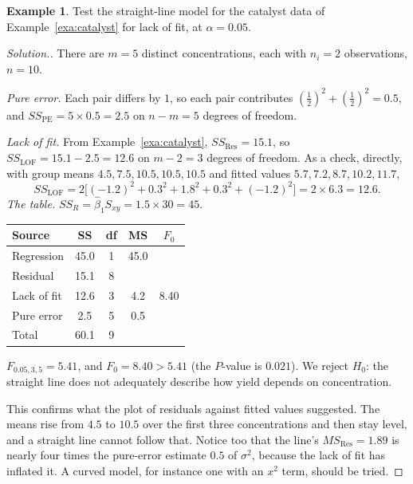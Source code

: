 \documentclass[11pt,a4paper]{article}
\numberwithin{equation}{section}
\theoremstyle{definition}
\newtheorem{exa}[thm]{Example}
\newenvironment{solution}
  {\renewcommand{\qedsymbol}{}\begin{proof}[\textit{Solution}.]}
  {\end{proof}}
\begin{document}
\begin{exa}\label{exa:catalyst-lof}
Test the straight-line model for the catalyst data of Example~\ref{exa:catalyst} for lack of
fit, at $\alpha = 0.05$.
\end{exa}

\begin{solution}
There are $m = 5$ distinct concentrations, each with $n_i = 2$ observations, $n = 10$.

\emph{Pure error.} Each pair differs by $1$, so each pair contributes
$(\tfrac12)^2 + (\tfrac12)^2 = 0.5$, and $SS_{\mathrm{PE}} = 5 \times 0.5 = 2.5$ on
$n - m = 5$ degrees of freedom.

\emph{Lack of fit.} From Example~\ref{exa:catalyst}, $SS_{\mathrm{Res}} = 15.1$, so
$SS_{\mathrm{LOF}} = 15.1 - 2.5 = 12.6$ on $m - 2 = 3$ degrees of freedom. As a check, directly,
with group means $4.5, 7.5, 10.5, 10.5, 10.5$ and fitted values $5.7, 7.2, 8.7, 10.2, 11.7$,
\[
SS_{\mathrm{LOF}} = 2\bigl[(-1.2)^2 + 0.3^2 + 1.8^2 + 0.3^2 + (-1.2)^2\bigr] = 2 \times 6.3 = 12.6 .
\]
\emph{The table.} $SS_R = \hat\beta_1 S_{xy} = 1.5 \times 30 = 45$.
\begin{center}
\begin{tabular}{lcccc}
Source & SS & df & MS & $F_0$ \\
\hline
Regression & 45.0 & 1 & 45.0 & \\
Residual & 15.1 & 8 & & \\
\quad Lack of fit & 12.6 & 3 & 4.2 & 8.40 \\
\quad Pure error & 2.5 & 5 & 0.5 & \\
\hline
Total & 60.1 & 9 & & \\
\end{tabular}
\end{center}
$F_{0.05,3,5} = 5.41$, and $F_0 = 8.40 > 5.41$ (the $P$-value is $0.021$). We reject $H_0$: the
straight line does not adequately describe how yield depends on concentration.

This confirms what the plot of residuals against fitted values suggested. The means rise
from $4.5$ to $10.5$ over the first three concentrations and then stay level, and a
straight line cannot follow that. Notice too that the line's $MS_{\mathrm{Res}} = 1.89$ is
nearly four times the pure-error estimate $0.5$ of $\sigma^2$, because the lack of fit has
inflated it. A curved model, for instance one with an $x^2$ term, should be tried.
\end{solution}
\end{document}
